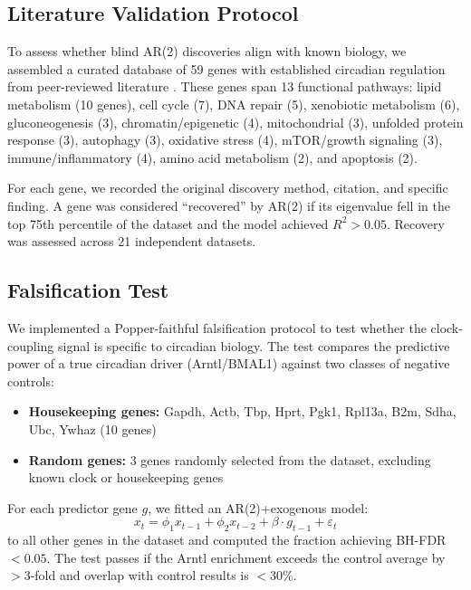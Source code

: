 \documentclass[11pt,letterpaper]{article}
\begin{document}
\subsection{Literature Validation Protocol}
\label{sec:litval-methods}

To assess whether blind AR(2) discoveries align with known biology, we assembled a curated database of 59 genes with established circadian regulation from peer-reviewed literature \citep{panda2002coordinated, matsuo2003control, kang2009modulation, zhang2014circadian}. These genes span 13 functional pathways: lipid metabolism (10 genes), cell cycle (7), DNA repair (5), xenobiotic metabolism (6), gluconeogenesis (3), chromatin/epigenetic (4), mitochondrial (3), unfolded protein response (3), autophagy (3), oxidative stress (4), mTOR/growth signaling (3), immune/inflammatory (4), amino acid metabolism (2), and apoptosis (2).

For each gene, we recorded the original discovery method, citation, and specific finding. A gene was considered ``recovered'' by AR(2) if its eigenvalue fell in the top 75th percentile of the dataset and the model achieved $R^2 > 0.05$. Recovery was assessed across 21 independent datasets.

\subsection{Falsification Test}
\label{sec:falsification-methods}

We implemented a Popper-faithful falsification protocol to test whether the clock-coupling signal is specific to circadian biology. The test compares the predictive power of a true circadian driver (Arntl/BMAL1) against two classes of negative controls:
\begin{itemize}
\item \textbf{Housekeeping genes:} Gapdh, Actb, Tbp, Hprt, Pgk1, Rpl13a, B2m, Sdha, Ubc, Ywhaz (10 genes)
\item \textbf{Random genes:} 3 genes randomly selected from the dataset, excluding known clock or housekeeping genes
\end{itemize}

For each predictor gene $g$, we fitted an AR(2)+exogenous model:
\begin{equation}
x_t = \phi_1 x_{t-1} + \phi_2 x_{t-2} + \beta \cdot g_{t-1} + \varepsilon_t
\end{equation}
to all other genes in the dataset and computed the fraction achieving BH-FDR $< 0.05$. The test passes if the Arntl enrichment exceeds the control average by $>$3-fold and overlap with control results is $<$30\%.
\end{document}
